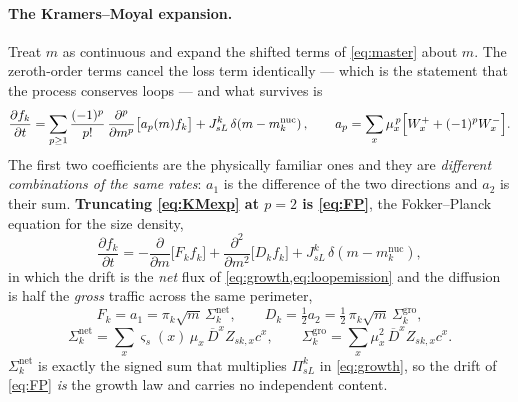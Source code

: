 \documentclass{article}
\begin{document}
\paragraph{The Kramers--Moyal expansion.} Treat $m$ as continuous and expand the
shifted terms of \cref{eq:master} about $m$. The zeroth-order terms cancel the
loss term identically --- which is the statement that the process conserves loops
--- and what survives is
\begin{equation}
  \frac{\partial f_k}{\partial t}
   =\sum_{p\ge1}\frac{(-1)^{p}}{p!}\,
     \frac{\partial^{p}}{\partial m^{p}}\bigl[a_p(m)f_k\bigr]
   +J^k_{sL}\,\delta\!\left(m-m^{\mathrm{nuc}}_k\right),
  \qquad
  a_p=\sum_x\mu_x^{\,p}\Bigl[W^{+}_{x}+(-1)^{p}W^{-}_{x}\Bigr].
  \label{eq:KMexp}
\end{equation}
The first two coefficients are the physically familiar ones and they are
\emph{different combinations of the same rates}: $a_1$ is the difference of the
two directions and $a_2$ is their sum. \textbf{Truncating \cref{eq:KMexp} at $p=2$
is \cref{eq:FP}}, the Fokker--Planck equation for the size density,
\begin{equation}
  \frac{\partial f_k}{\partial t}
  =-\frac{\partial}{\partial m}\bigl[F_k f_k\bigr]
   +\frac{\partial^2}{\partial m^2}\bigl[D_k f_k\bigr]
   +J^k_{sL}\,\delta\!\left(m-m^{\mathrm{nuc}}_k\right),
  \label{eq:FP}
\end{equation}
in which the drift is the \emph{net} flux of \cref{eq:growth,eq:loopemission}
and the diffusion is half the \emph{gross} traffic across the same perimeter,
\begin{equation}
  F_k=a_1=\pi_k\sqrt m\,\Sigma^{\mathrm{net}}_k,
  \qquad
  D_k=\tfrac12 a_2=\tfrac12\,\pi_k\sqrt m\,\Sigma^{\mathrm{gro}}_k,
  \label{eq:FPcoeffs}
\end{equation}
\begin{equation}
  \Sigma^{\mathrm{net}}_k=\sum_x\varsigma_s(x)\,\mu_x\,\overline D^{x}Z_{sk,x}c^{x},
  \qquad
  \Sigma^{\mathrm{gro}}_k=\sum_x\mu_x^{2}\,\overline D^{x}Z_{sk,x}c^{x}.
  \label{eq:Sigmas}
\end{equation}
$\Sigma^{\mathrm{net}}_k$ is exactly the signed sum that multiplies $\Pi^k_{sL}$
in \cref{eq:growth}, so the drift of \cref{eq:FP} \emph{is} the growth law and
carries no independent content.
\end{document}
